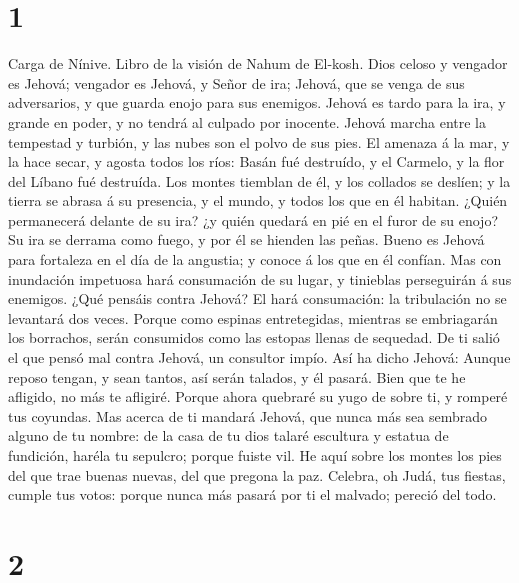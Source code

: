 \hypertarget{section}{%
\section{1}\label{section}}

 Carga de Nínive. Libro de la visión de Nahum de El-kosh.
 Dios celoso y vengador es Jehová; vengador es Jehová, y
Señor de ira; Jehová, que se venga de sus adversarios, y que guarda
enojo para sus enemigos.  Jehová es tardo para la ira, y
grande en poder, y no tendrá al culpado por inocente. Jehová marcha
entre la tempestad y turbión, y las nubes son el polvo de sus pies.
 El amenaza á la mar, y la hace secar, y agosta todos los
ríos: Basán fué destruído, y el Carmelo, y la flor del Líbano fué
destruída.  Los montes tiemblan de él, y los collados se
deslíen; y la tierra se abrasa á su presencia, y el mundo, y todos los
que en él habitan.  ¿Quién permanecerá delante de su ira? ¿y
quién quedará en pié en el furor de su enojo? Su ira se derrama como
fuego, y por él se hienden las peñas.  Bueno es Jehová para
fortaleza en el día de la angustia; y conoce á los que en él confían.
 Mas con inundación impetuosa hará consumación de su lugar,
y tinieblas perseguirán á sus enemigos.  ¿Qué pensáis contra
Jehová? El hará consumación: la tribulación no se levantará dos veces.
 Porque como espinas entretegidas, mientras se embriagarán
los borrachos, serán consumidos como las estopas llenas de sequedad.
 De ti salió el que pensó mal contra Jehová, un consultor
impío.  Así ha dicho Jehová: Aunque reposo tengan, y sean
tantos, así serán talados, y él pasará. Bien que te he afligido, no más
te afligiré.  Porque ahora quebraré su yugo de sobre ti, y
romperé tus coyundas.  Mas acerca de ti mandará Jehová, que
nunca más sea sembrado alguno de tu nombre: de la casa de tu dios talaré
escultura y estatua de fundición, haréla tu sepulcro; porque fuiste vil.
 He aquí sobre los montes los pies del que trae buenas
nuevas, del que pregona la paz. Celebra, oh Judá, tus fiestas, cumple
tus votos: porque nunca más pasará por ti el malvado; pereció del todo.

\hypertarget{section-1}{%
\section{2}\label{section-1}}

